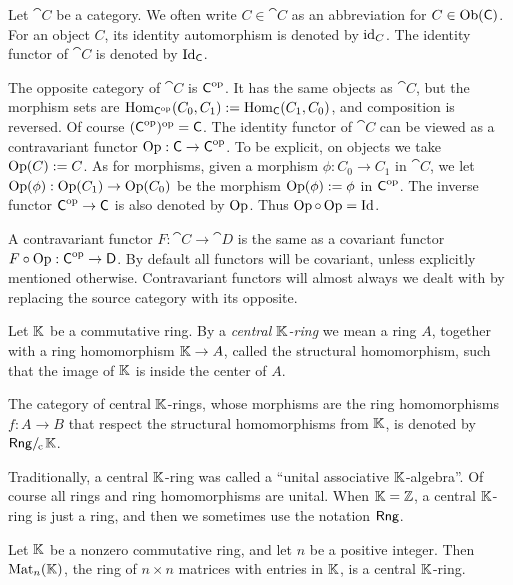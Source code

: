  \label{subsec:notation}

Let $\cat{C}$ be a category. 
We often write $C \in \cat{C}$ as an abbreviation for 
$C \in \operatorname{Ob}(\operatorname{\mathsf{C}})$. For an object $C$, its identity automorphism is 
denoted by $\operatorname{id}_C$. The identity functor of $\cat{C}$ is denoted by 
$\operatorname{Id}_{\operatorname{\mathsf{C}}}$. 

The opposite category of $\cat{C}$ is $\operatorname{\mathsf{C}}^{\mathrm{op}}$.
It has the same objects as $\cat{C}$, but the morphism sets are 
$\operatorname{Hom}_{\operatorname{\mathsf{C}}^{\mathrm{op}}}(C_0, C_1) :=
\operatorname{Hom}_{\operatorname{\mathsf{C}}}(C_1, C_0)$,
and composition is reversed. Of course 
$(\operatorname{\mathsf{C}}^{\mathrm{op}})^{\mathrm{op}} = \operatorname{\mathsf{C}}$. 
The identity functor of $\cat{C}$ can be viewed as a contravariant functor 
$\operatorname{Op} : \operatorname{\mathsf{C}} \to \operatorname{\mathsf{C}}^{\mathrm{op}}$. 
To be explicit, on objects we take 
$\operatorname{Op}(C) := C$. As for morphisms, given a morphism 
$\phi : C_0 \to C_1$ in $\cat{C}$, we let 
$\operatorname{Op}(\phi) : \operatorname{Op}(C_1) \to \operatorname{Op}(C_0)$
be the morphism $\operatorname{Op}(\phi) := \phi$ in $\operatorname{\mathsf{C}}^{\mathrm{op}}$.
The inverse functor $\operatorname{\mathsf{C}}^{\mathrm{op}} \to \operatorname{\mathsf{C}}$ is also denoted by 
$\operatorname{Op}$.
Thus $\operatorname{Op} \circ \operatorname{Op} = \operatorname{Id}$. 

A contravariant functor $F : \cat{C} \to \cat{D}$
is the same as a covariant functor 
$F \circ \operatorname{Op} : \operatorname{\mathsf{C}}^{\mathrm{op}} \to \operatorname{\mathsf{D}}$.
By default all functors will be covariant, unless explicitly mentioned 
otherwise. Contravariant functors will almost always we dealt with by replacing 
the source 
category with its opposite.

\begin{dfn} \label{dfn:4125}
Let $\mathbb{K}$ be a commutative ring. By a 
{\em central $\mathbb{K}$-ring}%
we mean a ring 
$A$, together with a ring homomorphism $\mathbb{K} \to A$, called the structural 
homomorphism, such that the image of 
$\mathbb{K}$ is inside the center of $A$. 

The category of central $\mathbb{K}$-rings, whose morphisms are the ring homomorphisms
$f : A \to B$ that respect the structural homomorphisms from $\mathbb{K}$, is denoted 
by $\mathrm{\mathsf{Rng}} /_{\mspace{-2mu} \mathrm{c}} \mspace{2mu} \mathbb{K}$.  
\end{dfn}

Traditionally, a central $\mathbb{K}$-ring was called a ``unital associative 
$\mathbb{K}$-algebra''. Of course all rings and ring homomorphisms are unital.
When $\mathbb{K} = \mathbb{Z}$, a central $\mathbb{K}$-ring is just a ring, and then we 
sometimes use the notation $\mathrm{\mathsf{Rng}}$. 

\begin{exa}  \label{exa:1035}
Let $\mathbb{K}$ be a nonzero commutative ring, and let $n$ be a positive integer. Then 
$\operatorname{Mat}_n(\mathbb{K})$, the ring of $n \times n$ matrices with entries in $\mathbb{K}$, is a 
central $\mathbb{K}$-ring. 
\end{exa}

